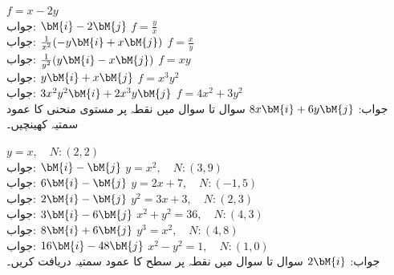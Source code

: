 \quad
$f=x-2y$\\
جواب:\quad
$\bM{i}-2\bM{j}$
\quad
$f=\frac{y}{x}$\\
جواب:\quad
$\frac{1}{x^2}(-y\bM{i}+x\bM{j})$
\quad
$f=\frac{x}{y}$\\
جواب:\quad
$\frac{1}{y^2}(y\bM{i}-x\bM{j})$
\quad
$f=xy$\\
جواب:\quad
$y\bM{i}+x\bM{j}$
\quad
$f=x^3y^2$\\
جواب:\quad
$3x^2y^2\bM{i}+2x^3y\bM{j}$
\quad
$f=4x^2+3y^2$\\
جواب:\quad
$8x\bM{i}+6y\bM{j}$
سوال  تا سوال  میں نقطہ  پر  مستوی منحنی کا عمود سمتیہ کھینچیں۔

\quad
$y=x,\quad N:(2,2)$\\
جواب:\quad
$\bM{i}-\bM{j}$
\quad
$y=x^2,\quad N:(3,9)$\\
جواب:\quad
$6\bM{i}-\bM{j}$
\quad
$y=2x+7,\quad N:(-1,5)$\\
جواب:\quad
$2\bM{i}-\bM{j}$
\quad
$y^2=3x+3,\quad N:(2,3)$\\
جواب:\quad
$3\bM{i}-6\bM{j}$
\quad
$x^2+y^2=36,\quad N:(4,3)$\\
جواب:\quad
$8\bM{i}+6\bM{j}$
\quad
$y^3=x^2,\quad N:(4,8)$\\
جواب:\quad
$16\bM{i}-48\bM{j}$
\quad
$x^2-y^2=1,\quad N:(1,0)$\\
جواب:\quad
$2\bM{i}$
سوال  تا سوال  میں نقطہ  پر  سطح کا عمود سمتیہ دریافت کریں۔

